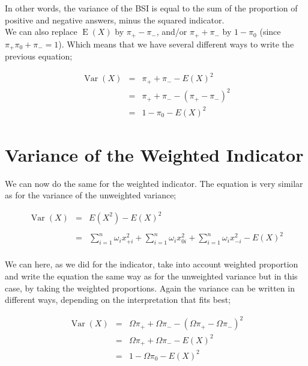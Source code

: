 \documentclass[12pt,a4paper,oneside]{book}
\DeclareMathOperator{\Var}{Var}
\DeclareMathOperator{\E}{E}
\begin{document}
In other words, the variance of the BSI is equal to the sum of the proportion of positive and negative answers, minus the squared indicator. \\
We can also replace $\E(X)$  by $\pi_+ - \pi_-$, and/or $\pi_+ + \pi_-$ by $ 1 - \pi_0$ (since $\pi_+ \pi_0 + \pi_- = 1$).
Which means that we have several different ways to write the previous equation;

\begin{eqnarray}
\Var(X) &=& \pi_+ + \pi_- - E ( X )^2  \nonumber \\
        &=& \pi_+ + \pi_- - ( \pi_+ - \pi_- )^2 \label{var2} \\
	    &=& 1 - \pi_0 - E(X)^2 \label{var3}
\end{eqnarray}




\section{Variance of the Weighted Indicator}

We can now do the same for the weighted indicator. The equation is very similar as for the variance of the unweighted variance;


\begin{eqnarray}
\Var(X) &=&  E\left( X^2\right) - E\left( X\right)^2 \nonumber \\ \nonumber \\
    &=& \sum_{i=1}^n \omega_i x_{+i}^2 + \sum_{i=1}^n \omega_i x_{0i}^2  + \sum_{i=1}^n \omega_i x_{-i}^2 - E(X)^2 \nonumber \\
\end{eqnarray}

We can here, as we did for the indicator, take into account weighted proportion and write the equation the same way as for the unweighted variance but in this case, by taking the weighted proportions. Again the variance can be written in different ways, depending on the interpretation that fits best;

\begin{eqnarray}
\Var(X) &=& \Omega \pi_+ + \Omega \pi_- - ( \Omega \pi_+ - \Omega \pi_- )^2 \\
	&=& \Omega \pi_+ + \Omega \pi_- - E ( X )^2 \\
	&=& 1 - \Omega \pi_{0} - E(X)^2
\end{eqnarray}
\end{document}
